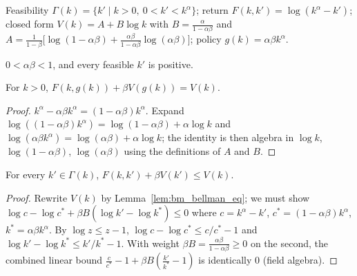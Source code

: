 \begin{definition}
\label{def:brock_mirman}
\leanok
{}
Feasibility $\Gamma(k) = \{k' \mid k > 0,\ 0 < k' < k^\alpha\}$; return $F(k, k') = \log(k^\alpha - k')$;
closed form $V(k) = A + B \log k$ with $B = \frac{\alpha}{1 - \alpha\beta}$ and
$A = \frac{1}{1-\beta}\big[\log(1 - \alpha\beta) + \frac{\alpha\beta}{1-\alpha\beta}\log(\alpha\beta)\big]$;
policy $g(k) = \alpha\beta k^\alpha$.
\end{definition}

\begin{lemma}
\label{lem:bm_ab}
\leanok
{}
$0 < \alpha\beta < 1$, and every feasible $k'$ is positive.
\end{lemma}

\begin{lemma}
\label{lem:bm_bellman_eq}
\leanok
{}
For $k > 0$, $F(k, g(k)) + \beta V(g(k)) = V(k)$.
\end{lemma}
\begin{proof}
\leanok
$k^\alpha - \alpha\beta k^\alpha = (1 - \alpha\beta) k^\alpha$. Expand
$\log((1-\alpha\beta)k^\alpha) = \log(1-\alpha\beta) + \alpha\log k$ and
$\log(\alpha\beta k^\alpha) = \log(\alpha\beta) + \alpha \log k$; the identity is then algebra in
$\log k$, $\log(1-\alpha\beta)$, $\log(\alpha\beta)$ using the definitions of $A$ and $B$.
\end{proof}

\begin{lemma}
\label{lem:bm_bellman_le}
\leanok
{}
For every $k' \in \Gamma(k)$, $F(k, k') + \beta V(k') \le V(k)$.
\end{lemma}
\begin{proof}
\leanok
Rewrite $V(k)$ by Lemma~\ref{lem:bm_bellman_eq}; we must show
$\log c - \log c^* + \beta B (\log k' - \log k^*) \le 0$ where $c = k^\alpha - k'$,
$c^* = (1 - \alpha\beta) k^\alpha$, $k^* = \alpha\beta k^\alpha$. By $\log z \le z - 1$,
$\log c - \log c^* \le c/c^* - 1$ and $\log k' - \log k^* \le k'/k^* - 1$. With weight
$\beta B = \frac{\alpha\beta}{1-\alpha\beta} \ge 0$ on the second, the combined linear bound
$\frac{c}{c^*} - 1 + \beta B(\frac{k'}{k^*} - 1)$ is identically $0$ (field algebra).
\end{proof}

